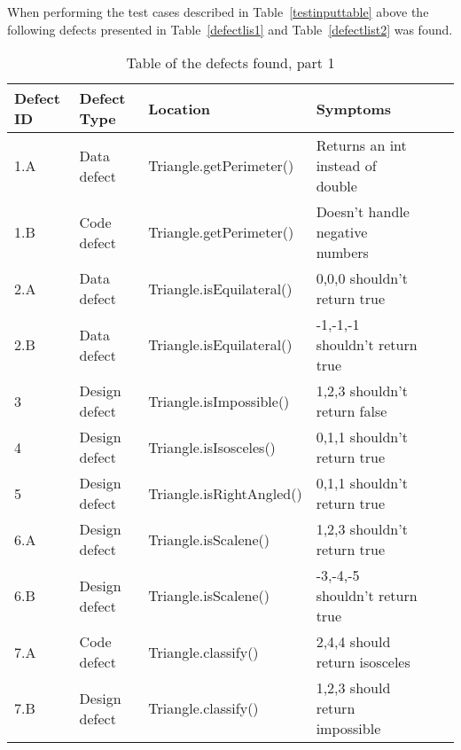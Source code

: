 When performing the test cases described in Table~\ref{testinputtable} above the following defects presented in Table~\ref{defectlis1} and Table~\ref{defectlist2} was found.

\begin{table}[!htb]
\caption{Table of the defects found, part 1}
\label{defectlist1}
\begin{tabular}{|l|l|l|l|l|l|}
\hline  Defect ID & Defect Type   & Location  & Symptoms\\ \hline
1.A       & Data defect   & Triangle.getPerimeter()  & Returns an int instead of double \\
1.B       & Code defect   & Triangle.getPerimeter()  & Doesn't handle negative numbers  \\
2.A       & Data defect   & Triangle.isEquilateral() & 0,0,0 shouldn't return true      \\
2.B       & Data defect   & Triangle.isEquilateral() & -1,-1,-1 shouldn't return true   \\
3         & Design defect & Triangle.isImpossible()  & 1,2,3 shouldn't return false     \\
4         & Design defect & Triangle.isIsosceles()   & 0,1,1 shouldn't return true      \\
5         & Design defect & Triangle.isRightAngled() & 0,1,1 shouldn't return true      \\
6.A       & Design defect & Triangle.isScalene()     & 1,2,3 shouldn't return true      \\
6.B       & Design defect & Triangle.isScalene()     & -3,-4,-5 shouldn't return true   \\
7.A       & Code defect   & Triangle.classify()      & 2,4,4 should return isosceles    \\
7.B       & Design defect & Triangle.classify()      & 1,2,3 should return impossible   \\         \hline     
\end{tabular}
\end{table}

